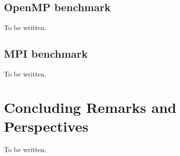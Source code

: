 \documentclass[pdftex,preprint,3p,times,numbers]{elsarticle}
\begin{document}
\subsection{OpenMP benchmark}\label{subsec:openmp}

{\color{red} To be written.}

\subsection{MPI benchmark}\label{subsec:mpi}

{\color{red} To be written.}

\section{Concluding Remarks and Perspectives}\label{sec:conclusions}

{\color{red} To be written.}



\end{document}
